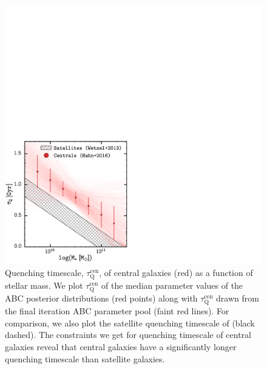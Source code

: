 \documentclass[iop,apj,tighten,twocolappendix,numberedappendix]{emulateapj}
\newcommand{\taucen}{\tau_\mathrm{Q}^\mathrm{cen}}
\begin{document}
\begin{figure}
\begin{center}
\includegraphics[scale=0.45]{figs/tau_ABC_posterior_RHOssfrfq_TinkerFq_Std_updated_prior.pdf}
\caption{Quenching timescale, $\taucen$, of central galaxies (red) 
as a function of stellar mass. We plot $\taucen$ of the median parameter values 
of the ABC posterior distributions (red points) along with $\taucen$ drawn from 
the final iteration ABC parameter pool (faint red lines). For comparison, we also 
plot the satellite quenching timescale of \cite{Wetzel:2014aa} (black dashed). 
The constraints we
get for quenching timescale of central galaxies reveal that central galaxies 
have a significantly longer quenching timescale than satellite galaxies.} 
\label{fig:abc_tau}
\end{center}
\end{figure}
\end{document}
